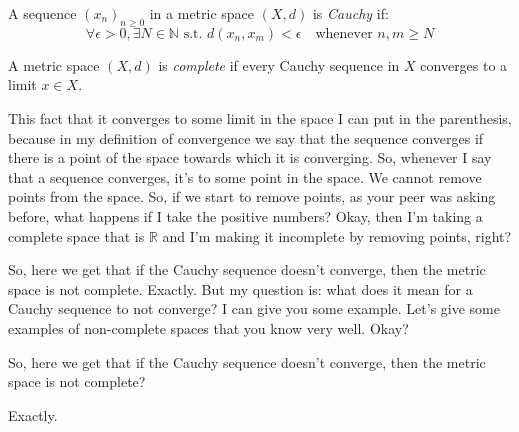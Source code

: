 \begin{math-stroke}
\setcounter{theorem}{26}
\begin{definition}\label{def:cauchy-sequence-v2}
A sequence $(x_n)_{n \ge 0}$ in a metric space $(X, d)$ is \emph{Cauchy} if:
\[ \forall \epsilon > 0, \exists N \in \mathbb{N} \text{ s.t. } d(x_n, x_m) < \epsilon \quad \text{whenever } n, m \ge N \]
\end{definition}

\setcounter{theorem}{28}
\begin{definition}\label{def:complete-space-v2}
A metric space $(X, d)$ is \emph{complete} if every Cauchy sequence in $X$ converges to a limit $x \in X$.
\end{definition}
\end{math-stroke}

\begin{spoken-clean}[00:01:25 - 00:02:26]
This fact that it converges to some limit in the space I can put in the parenthesis, because in my definition of convergence we say that the sequence converges if there is a point of the space towards which it is converging. So, whenever I say that a sequence converges, it's to some point in the space. We cannot remove points from the space. So, if we start to remove points, as your peer was asking before, what happens if I take the positive numbers? Okay, then I'm taking a complete space that is $\mathbb{R}$ and I'm making it incomplete by removing points, right?
\end{spoken-clean}

\begin{spoken-clean}[00:02:26 - 00:03:12]
So, here we get that if the Cauchy sequence doesn't converge, then the metric space is not complete. Exactly. But my question is: what does it mean for a Cauchy sequence to not converge? I can give you some example. Let's give some examples of non-complete spaces that you know very well. Okay?
\end{spoken-clean}

\begin{student-interaction}
So, here we get that if the Cauchy sequence doesn't converge, then the metric space is not complete?
\end{student-interaction}

\begin{spoken-clean}[continued]
Exactly.
\end{spoken-clean}

